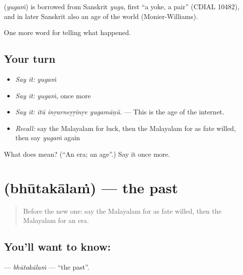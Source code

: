 \begin{cousinweb}
\textbf{} (\emph{yugaṁ}) is borrowed from Sanskrit \emph{yuga}, first \textquotedblleft{}a yoke, a pair\textquotedblright{} (CDIAL 10482), and in later Sanskrit also an age of the world (Monier-Williams).
\end{cousinweb}

\begin{grammarlens}[title={What you've built}]
One more word for telling what happened.
\end{grammarlens}

\subsection*{Your turn}
\begin{itemize}
\raggedright
  \item \emph{Say it:} \emph{yugaṁ}
  \item \emph{Say it:} \emph{yugaṁ}, once more
  \item \emph{Say it:} \emph{itŭ inṟarneṟṟinṟe yugamāṇŭ.} — This is the age of the internet.
  \item \emph{Recall:} say the Malayalam for luck, then the Malayalam for as fate willed, then say \emph{yugaṁ} again
\end{itemize}

\begin{tcolorbox}[breakable,colback=teal!4,colframe=teal!35!black,title={Before you move on}]
What does  mean? (\textquotedblleft{}An era; an age\textquotedblright{}.) Say it once more.
\end{tcolorbox}
\section[\texorpdfstring{\ml{ഭൂതകാലം} (bhūtakālaṁ)}{ഭൂതകാലം (bhūtakālaṁ)}]{ (bhūtakālaṁ) — the past}

\label{lesson:ML-C361-bhutakalam}



\begin{quote}
Before the new one: say the Malayalam for as fate willed, then the Malayalam for an era.
\end{quote}

\subsection*{You'll want to know: }
\textbf{} — \emph{bhūtakālaṁ} — \textquotedblleft{}the past\textquotedblright{}.

